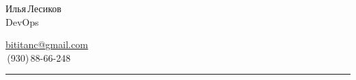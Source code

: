 \documentclass[11pt, a4paper]{article}
\newcommand\Eng[1]{%
  \foreignlanguage{english}{#1}%
}
\begin{document}
\sffamily

{\setlength\multicolsep{0pt}%
\begin{multicols}{2}

\begin{spacing}{1.5}
  {\LARGE Илья\,Лесиков}\\
  {\Large\Eng{DevOps}}\hspace{1.3cm}{\large 25\,лет}
\end{spacing}

\columnbreak

\begin{flushright}
  \begin{spacing}{1.3}
    {\large\href{mailto:bititanc@gmail.com}{\Eng{bititanc@gmail.com}}}\\
    \fontsize{1.4em}{0}\,(930)\,88-66-248 \normalsize\\
  \end{spacing}
\end{flushright}

\end{multicols}
}

\vspace{-10pt}
\textcolor[RGB]{220,220,220}{\rule{\linewidth}{0.2pt}}
\vspace{5pt}

\begin{comment}
У меня нет образования (неоконченный колледж электроники) и сомнительный стаж (10 месяцев сисадмином).\\
Но, самообучаясь, за последние пару лет я получил достаточный опыт и в общей автоматизации, и в \Eng{CI/CD}.\\
Получил некоторый опыт и в кодинге, как и хороший общий технический бэкграунд (\Eng{Linux}, сети и т.\,п.).
\end{comment}

\begin{comment}
\textrm{Тестирование тест тест}\\
\textsf{Тестирование тест тест}\\
\texttt{Тестирование тест тест}\\
\Eng{\textrm{Testing test test}}\\
\Eng{Vagrant, Ansible, Jenkins, Kubernetes, Zabbix, ELK}\\
\Eng{Testing test test}\\
\Eng{\texttt{Testing test test}}\\
\end{comment}
\end{document}
